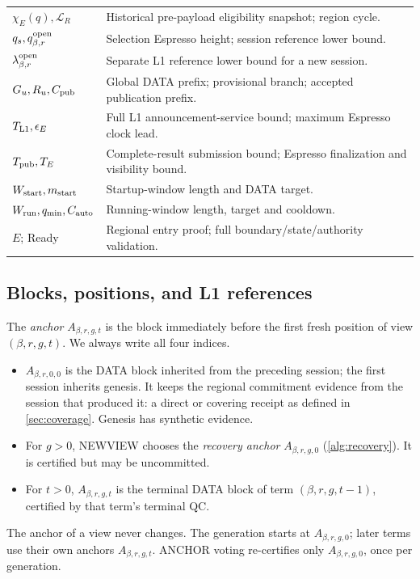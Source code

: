 \documentclass[11pt,a4paper]{article}
\newcommand{\defterm}[1]{\textcolor{rrBlue}{\textit{#1}}}
\begin{document}
\begin{table}[htbp]
\begin{tabularx}{\linewidth}{@{}p{.32\linewidth}Y@{}}
$\chi_E(q),\mathcal L_R$ & Historical pre-payload eligibility snapshot; region cycle.\\
$q_s,q_{\beta,r}^{\rm open}$ & Selection Espresso height; session reference lower bound.\\
$\lambda_{\beta,r}^{\rm open}$ & Separate L1 reference lower bound for a new session.\\
$G_u,R_u,C_{\rm pub}$ & Global DATA prefix; provisional branch; accepted publication prefix.\\
$T_{\rm L1},\epsilon_E$ & Full L1 announcement-service bound; maximum Espresso clock lead.\\
$T_{\rm pub},T_E$ & Complete-result submission bound; Espresso finalization and visibility bound.\\
$W_{\rm start},m_{\rm start}$ & Startup-window length and DATA target.\\
$W_{\rm run},q_{\min},C_{\rm auto}$ & Running-window length, target and cooldown.\\
$E$; Ready & Regional entry proof; full boundary/state/authority validation.\\
\bottomrule\end{tabularx}
\end{table}

\subsection{Blocks, positions, and L1 references}
\label{sec:blocks}
The \defterm{anchor} $A_{\beta,r,g,t}$ is the block immediately before the first fresh
position of view $(\beta,r,g,t)$. We always write all four indices.
\begin{itemize}
\item $A_{\beta,r,0,0}$ is the DATA block inherited from the preceding
session; the first session inherits genesis. It keeps the regional commitment evidence from the session that
produced it: a direct or covering receipt as defined in
\cref{sec:coverage}. Genesis has synthetic evidence.
\item For $g>0$, NEWVIEW chooses the \defterm{recovery anchor} $A_{\beta,r,g,0}$
(\cref{alg:recovery}). It is certified but may be uncommitted.
\item For $t>0$, $A_{\beta,r,g,t}$ is the terminal DATA block of term
$(\beta,r,g,t-1)$, certified by that term's terminal QC.
\end{itemize}
The anchor of a view never changes. The generation starts at
$A_{\beta,r,g,0}$; later terms use their own anchors $A_{\beta,r,g,t}$. ANCHOR voting
re-certifies only $A_{\beta,r,g,0}$, once per generation.
\end{document}
